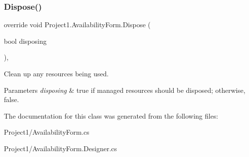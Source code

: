 \subsubsection{\texorpdfstring{Dispose()}{Dispose()}}
{\footnotesize\ttfamily override void Project1.\+Availability\+Form.\+Dispose (\begin{DoxyParamCaption}\item[{bool}]{disposing }\end{DoxyParamCaption})\hspace{0.3cm}{\ttfamily [inline]}, {\ttfamily [protected]}}



Clean up any resources being used. 


\begin{DoxyParams}{Parameters}
{\em disposing} & true if managed resources should be disposed; otherwise, false.\\
\hline
\end{DoxyParams}


The documentation for this class was generated from the following files\+:\begin{DoxyCompactItemize}
\item 
Project1/Availability\+Form.\+cs\item 
Project1/Availability\+Form.\+Designer.\+cs\end{DoxyCompactItemize}
